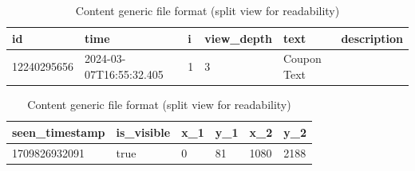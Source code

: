 \documentclass[licencjacka,en]{pracamgr}
\begin{document}
\begin{table}[h]
\centering
\begin{tabular}{llllll}
\toprule
id & time & i & view\_depth & text & description \\
\midrule
12240295656 & 2024-03-07T16:55:32.405 & 1 & 3 & Coupon Text &  \\
\bottomrule
\end{tabular}

\vspace{1em}

\begin{tabular}{llllll}
\toprule
seen\_timestamp & is\_visible & x\_1 & y\_1 & x\_2 & y\_2 \\
\midrule
1709826932091 & true & 0 & 81 & 1080 & 2188 \\
\bottomrule
\end{tabular}

\caption{Content generic file format (split view for readability)}
\label{tab:csv_raw_cg}
\end{table}
\end{document}
